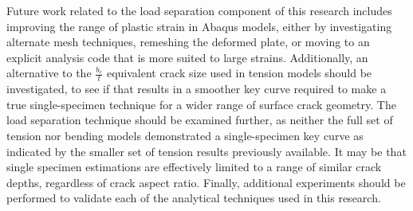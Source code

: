 Future work related to the load separation component of this research includes improving the range of plastic strain in Abaqus models, either by investigating alternate mesh techniques, remeshing the deformed plate, or moving to an explicit analysis code that is more suited to large strains.
Additionally, an alternative to the \(\frac{b_e}{t}\) equivalent crack size used in tension models should be investigated, to see if that results in a smoother key curve required to make a true single-specimen technique for a wider range of surface crack geometry.
The load separation technique should be examined further, as neither the full set of tension nor bending models demonstrated a single-specimen key curve as indicated by the smaller set of tension results previously available.
It may be that single specimen estimations are effectively limited to a range of similar crack depths, regardless of crack aspect ratio.
Finally, additional experiments should be performed to validate each of the analytical techniques used in this research.

